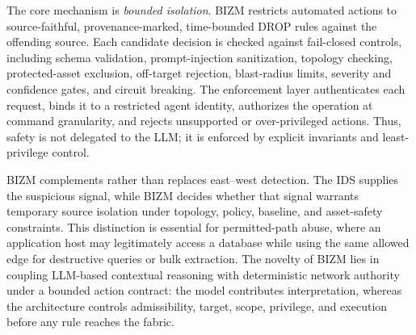 \documentclass[final,5p]{elsarticle}
\begin{document}
The core mechanism is \emph{bounded isolation}. BIZM restricts automated actions to source-faithful, provenance-marked, time-bounded DROP rules against the offending source. Each candidate decision is checked against fail-closed controls, including schema validation, prompt-injection sanitization, topology checking, protected-asset exclusion, off-target rejection, blast-radius limits, severity and confidence gates, and circuit breaking. The enforcement layer authenticates each request, binds it to a restricted agent identity, authorizes the operation at command granularity, and rejects unsupported or over-privileged actions. Thus, safety is not delegated to the LLM; it is enforced by explicit invariants and least-privilege control.

BIZM complements rather than replaces east--west detection. The IDS supplies the suspicious signal, while BIZM decides whether that signal warrants temporary source isolation under topology, policy, baseline, and asset-safety constraints. This distinction is essential for permitted-path abuse, where an application host may legitimately access a database while using the same allowed edge for destructive queries or bulk extraction. The novelty of BIZM lies in coupling LLM-based contextual reasoning with deterministic network authority under a bounded action contract: the model contributes interpretation, whereas the architecture controls admissibility, target, scope, privilege, and execution before any rule reaches the fabric.
\end{document}

